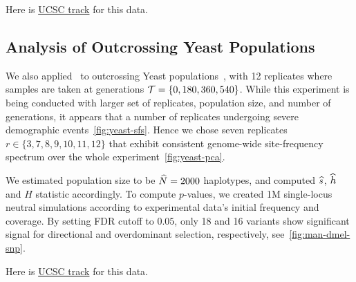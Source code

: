 


Here is 
\href{https://genome.ucsc.edu/cgi-bin/hgTracks?hgS_doOtherUser=submit&hgS_otherUserName=airanmehr&hgS_otherUserSessionName=Dmel\%20EE\%20HotCold}{UCSC
 track} for this data.


\subsection{Analysis of Outcrossing Yeast Populations}
We also applied \comale\ to outcrossing Yeast 
populations~\cite{burke2014standing}, with 12 replicates where samples are 
taken at generations ${\cal T}=\{0,180,360,540\}$. While this experiment is being 
conducted with larger set of replicates, population size, and number of 
generations, it appears that a number of replicates undergoing severe 
demographic events~\ref{fig:yeast-sfs}. Hence we chose seven replicates 
$r\in\{3,7,8,9,10,11,12\}$ that exhibit consistent genome-wide site-frequency 
spectrum over the whole experiment~\ref{fig:yeast-pca}.

We estimated population size to be $\widehat{N}=2000$ haplotypes, and computed $\widehat{s}$, 
$\widehat{h}$ and $H$ statistic accordingly. To compute $p$-values, we created 1M 
single-locus neutral simulations according to experimental data's initial 
frequency and coverage. By setting FDR cutoff to $0.05$, only 18 and 16 
variants 
show significant signal for directional and overdominant selection, 
respectively, see~\ref{fig:man-dmel-snp}.

Here is 
\href{https://genome.ucsc.edu/cgi-bin/hgTracks?hgS_doOtherUser=submit\&hgS_otherUserName=airanmehr\&hgS_otherUserSessionName=Yeast\%20EE}{UCSC
 track} for this data.

